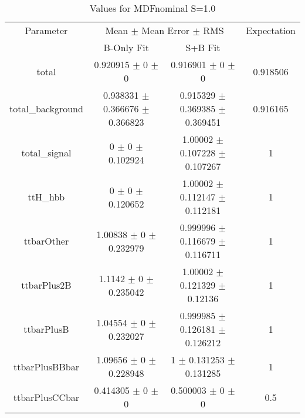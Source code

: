 \begin{table}
\centering
\caption{Values for MDFnominal S=1.0}
\begin{tabular}{cccc}
\toprule
Parameter & \multicolumn{2}{c}{Mean $\pm$ Mean Error $\pm$ RMS} & Expectation\\
 & B-Only Fit & S+B Fit & \\
\midrule
total & \num{0.920915} $\pm$ \num{0} $\pm$ \num{0} & \num{0.916901} $\pm$ \num{0} $\pm$ \num{0} & \num{0.918506}\\
total\_background & \num{0.938331} $\pm$ \num{0.366676} $\pm$ \num{0.366823} & \num{0.915329} $\pm$ \num{0.369385} $\pm$ \num{0.369451} & \num{0.916165}\\
total\_signal & \num{0} $\pm$ \num{0} $\pm$ \num{0.102924} & \num{1.00002} $\pm$ \num{0.107228} $\pm$ \num{0.107267} & \num{1}\\
ttH\_hbb & \num{0} $\pm$ \num{0} $\pm$ \num{0.120652} & \num{1.00002} $\pm$ \num{0.112147} $\pm$ \num{0.112181} & \num{1}\\
ttbarOther & \num{1.00838} $\pm$ \num{0} $\pm$ \num{0.232979} & \num{0.999996} $\pm$ \num{0.116679} $\pm$ \num{0.116711} & \num{1}\\
ttbarPlus2B & \num{1.1142} $\pm$ \num{0} $\pm$ \num{0.235042} & \num{1.00002} $\pm$ \num{0.121329} $\pm$ \num{0.12136} & \num{1}\\
ttbarPlusB & \num{1.04554} $\pm$ \num{0} $\pm$ \num{0.232027} & \num{0.999985} $\pm$ \num{0.126181} $\pm$ \num{0.126212} & \num{1}\\
ttbarPlusBBbar & \num{1.09656} $\pm$ \num{0} $\pm$ \num{0.228948} & \num{1} $\pm$ \num{0.131253} $\pm$ \num{0.131285} & \num{1}\\
ttbarPlusCCbar & \num{0.414305} $\pm$ \num{0} $\pm$ \num{0} & \num{0.500003} $\pm$ \num{0} $\pm$ \num{0} & \num{0.5}\\
\bottomrule
\end{tabular}
\end{table}